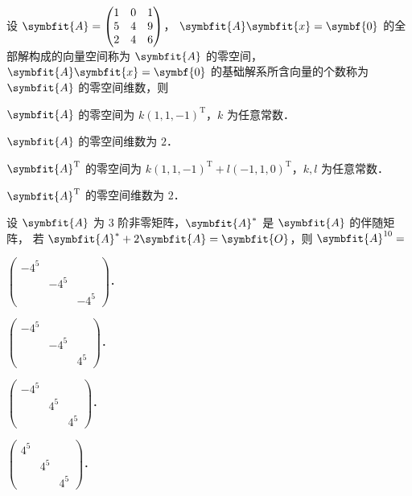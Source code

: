 \begin{question}[index=5]
设 $\symbfit{A}=\begin{pmatrix}1&0&1\\5&4&9\\2&4&6\end{pmatrix}$，
$\symbfit{A}\symbfit{x}=\symbf{0}$ 的全部解构成的向量空间称为 $\symbfit{A}$ 的零空间，\\
$\symbfit{A}\symbfit{x}=\symbf{0}$ 的\mbox{基础解系}所含向量的个数称为 $\symbfit{A}$ 的零空间维数，则
\begin{choices}[columns=1]
\item $\symbfit{A}$ 的零空间为 $k(1,1,-1)^{\mathrm T}$，$k$ 为任意常数．
\item $\symbfit{A}$ 的零空间维数为 $2$．
\item $\symbfit{A}^{\mathrm T}$ 的零空间为 $k(1,1,-1)^{\mathrm T}+l(-1,1,0)^{\mathrm T}$，$k,l$ 为任意常数．
\item $\symbfit{A}^{\mathrm T}$ 的零空间维数为 $2$．
\end{choices}
\end{question}
\QuestionBreak

\begin{question}[index=6]
设 $\symbfit{A}$ 为 $3$ 阶非零矩阵，$\symbfit{A}^*$ 是 $\symbfit{A}$ 的伴随矩阵，
若 $\symbfit{A}^*+2\symbfit{A}=\symbfit{O}$，则 $\symbfit{A}^{10}=$
\begin{choices}[columns=2,label-pos=left]
\item $\begin{pmatrix}-4^5&&\\&-4^5&\\&&-4^5\end{pmatrix}$．
\item $\begin{pmatrix}-4^5&&\\&-4^5&\\&&4^5\end{pmatrix}$．
\item $\begin{pmatrix}-4^5&&\\&4^5&\\&&4^5\end{pmatrix}$．
\item $\begin{pmatrix}4^5&&\\&4^5&\\&&4^5\end{pmatrix}$．
\end{choices}
\end{question}
\QuestionBreak

